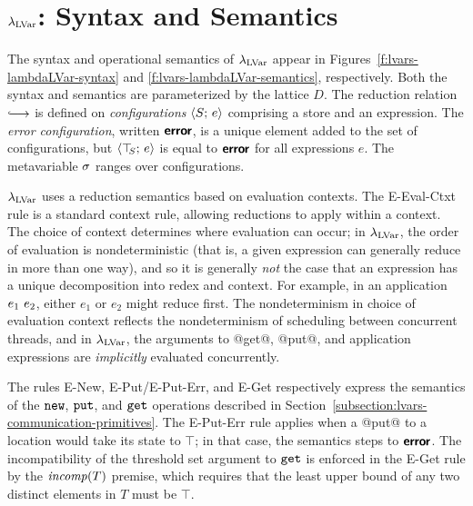 \section{$\lambda_{\textrm{LVar}}$: Syntax and Semantics}\label{s:lvars-lambdalvar}


\FigLambdaLVarGrammar

\FigLambdaLVarSemantics

The syntax and operational semantics of $\lambda_{\textrm{LVar}}$ appear in
Figures~\ref{f:lvars-lambdaLVar-syntax} and
\ref{f:lvars-lambdaLVar-semantics}, respectively.  Both the
syntax and semantics are parameterized by the lattice $D$.  The
reduction relation $\parstepsto$ is defined on \emph{configurations}
$\langle S;\, e \rangle$ comprising a store and an expression.  The \emph{error
  configuration}, written $\textbf{\textsf{error}}$, is a unique element added to the
set of configurations, but $\langle \top\hspace{-0.85mm}_{S};\, e \rangle$ is equal to $\textbf{\textsf{error}}$
for all expressions $e$.  The metavariable $\sigma$ ranges over
configurations.

$\lambda_{\textrm{LVar}}$ uses a reduction semantics based on evaluation contexts.
The {\sc E-Eval-Ctxt} rule is a standard context rule, allowing
reductions to apply within a context.  The choice of context
determines where evaluation can occur; in $\lambda_{\textrm{LVar}}$, the order of
evaluation is nondeterministic (that is, a given expression can
generally reduce in more than one way), and so it is generally
\emph{not} the case that an expression has a unique decomposition into
redex and context.  For example, in an application $e_1~e_2$,
either $e_1$ or $e_2$ might reduce first.  The nondeterminism in
choice of evaluation context reflects the nondeterminism of scheduling
between concurrent threads, and in $\lambda_{\textrm{LVar}}$, the arguments to
@get@, @put@, and application expressions are \emph{implicitly}
evaluated concurrently.


The rules {\sc E-New}, {\sc E-Put}/{\sc E-Put-Err}, and {\sc E-Get}
respectively express the semantics of the $\mbox{\texttt{new}}$, $\mbox{\texttt{put}}$, and $\mbox{\texttt{get}}$
operations described in
Section~\ref{subsection:lvars-communication-primitives}.  The {\sc
  E-Put-Err} rule applies when a @put@ to a location would take its
state to $\top$; in that case, the semantics steps to $\textbf{\textsf{error}}$.  The
incompatibility of the threshold set argument to $\mbox{\texttt{get}}$ is enforced in
the {\sc E-Get} rule by the $\mathit{incomp}(T)$ premise, which requires that
the least upper bound of any two distinct elements in $T$ must be
$\top$.

